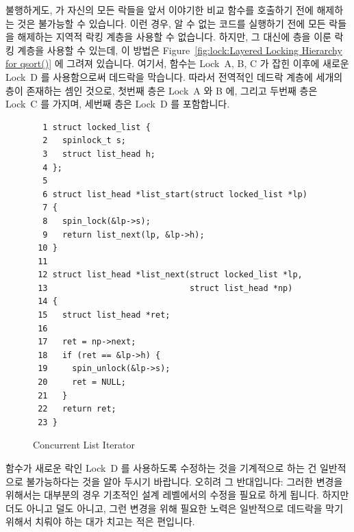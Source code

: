 불행하게도,  가 자신의 모든 락들을 앞서 이야기한 비교 함수를
호출하기 전에 해제하는 것은 불가능할 수 있습니다.
이런 경우, 알 수 없는 코드를 실행하기 전에 모든 락들을 해제하는 지역적 락킹
계층을 사용할 수 없습니다.
하지만, 그 대신에 층을 이룬 락킹 계층을 사용할 수 있는데, 이 방법은
Figure~\ref{fig:lock:Layered Locking Hierarchy for qsort()} 에 그려져 있습니다.
여기서,  함수는 Lock~A, B, C 가 잡힌 이후에 새로운 Lock~D 를
사용함으로써 데드락을 막습니다.
따라서 전역적인 데드락 계층에 세개의 층이 존재하는 셈인 것으로, 첫번째 층은
Lock~A 와 B 에, 그리고 두번째 층은 Lock~C 를 가지며, 세번째 층은 Lock~D 를
포함합니다.

\begin{figure}[tbp]
{ \scriptsize
\begin{verbatim}
  1 struct locked_list {
  2   spinlock_t s;
  3   struct list_head h;
  4 };
  5 
  6 struct list_head *list_start(struct locked_list *lp)
  7 {
  8   spin_lock(&lp->s);
  9   return list_next(lp, &lp->h);
 10 }
 11 
 12 struct list_head *list_next(struct locked_list *lp,
 13                             struct list_head *np)
 14 {
 15   struct list_head *ret;
 16 
 17   ret = np->next;
 18   if (ret == &lp->h) {
 19     spin_unlock(&lp->s);
 20     ret = NULL;
 21   }
 22   return ret;
 23 }
\end{verbatim}
}
\caption{Concurrent List Iterator}
\label{fig:locking:Concurrent List Iterator}
\end{figure}

 함수가 새로운 락인 Lock~D 를 사용하도록 수정하는 것을 기계적으로
하는 건 일반적으로 불가능하다는 것을 알아 두시기 바랍니다.
오히려 그 반대입니다: 그러한 변경을 위해서는 대부분의 경우 기초적인 설계
레벨에서의 수정을 필요로 하게 됩니다.
하지만 더도 아니고 덜도 아니고, 그런 변경을 위해 필요한 노력은 일반적으로
데드락을 막기 위해서 치뤄야 하는 대가 치고는 적은 편입니다.

